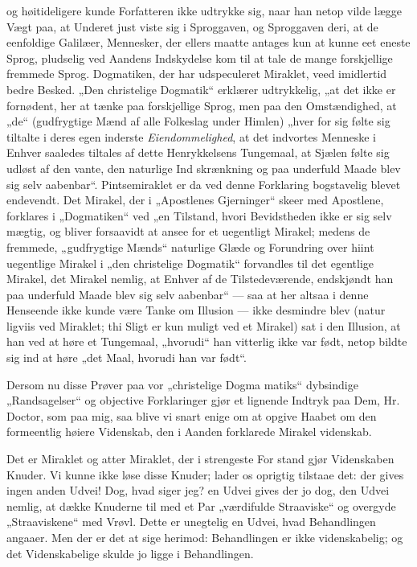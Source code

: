 \documentclass[12pt,a4paper]{article}
\newcommand{\opage}[1]{\marginnote{\footnotesize\textit{[#1]}}}
\begin{document}
og høitideligere kunde Forfatteren ikke udtrykke sig, naar han
netop vilde lægge Vægt paa, at Underet just viste sig i
Sproggaven, og Sproggaven deri, at de eenfoldige Galilæer,
Mennesker, der ellers maatte antages kun at kunne eet eneste
Sprog, pludselig ved Aandens Indskydelse kom til at tale de
mange forskjellige fremmede Sprog. Dogmatiken, der har
udspeculeret Miraklet, veed imidlertid bedre Besked. „Den
christelige Dogmatik“ erklærer udtrykkelig, „at det ikke er
fornødent, her at tænke paa forskjellige Sprog, men paa den
Omstændighed, at „de“ (gudfrygtige Mænd af alle Folkeslag
under Himlen) „hver for sig følte sig tiltalte i deres egen
inderste \emph{Eiendommelighed}, at det indvortes Menneske i
Enhver saaledes tiltales af dette Henrykkelsens Tungemaal,
at Sjælen følte sig udløst af den vante, den naturlige Ind\-%
skrænkning og paa underfuld Maade blev sig selv aabenbar“.
Pintsemiraklet er da ved denne Forklaring bogstavelig blevet
endevendt. Det Mirakel, der i „Apostlenes Gjerninger“ skeer
med Apostlene, forklares i „Dogmatiken“ ved „en Tilstand,
hvori Bevidstheden ikke er sig selv mægtig, og bliver forsaavidt%
at ansee for et uegentligt Mirakel; medens de fremmede,
„gudfrygtige Mænds“ naturlige Glæde og Forundring over
hiint uegentlige Mirakel i „den christelige Dogmatik“ forvandles
til det egentlige Mirakel, det Mirakel nemlig, at Enhver af
de Tilstedeværende, endskjøndt han paa underfuld Maade blev
sig selv aabenbar“ --- saa at her altsaa i denne Henseende ikke
kunde være Tanke om Illusion --- ikke desmindre blev (natur\-%
ligviis ved Miraklet; thi Sligt er kun muligt ved et Mirakel)
sat i den Illusion, at han ved at høre et Tungemaal,
„hvorudi“ han vitterlig ikke var født, netop bildte sig ind at
høre „det Maal, hvorudi han var født“.

\opage{11}\setcounter{footnote}{0}%
Dersom nu disse Prøver paa vor „christelige Dogma\-%
matiks“ dybsindige „Randsagelser“ og objective Forklaringer%
gjør et lignende Indtryk paa Dem, Hr. Doctor, som paa
mig, saa blive vi snart enige om at opgive Haabet om den
formeentlig høiere Videnskab, den i Aanden forklarede Mirakel\-%
videnskab.

Det er Miraklet og atter Miraklet, der i strengeste For\-%
stand gjør Videnskaben Knuder. Vi kunne ikke løse disse
Knuder; lader os oprigtig tilstaae det: der gives ingen anden
Udvei! Dog, hvad siger jeg? en Udvei gives der jo dog, den
Udvei nemlig, at dække Knuderne til med et Par „værdifulde
Straaviske“ og overgyde „Straaviskene“ med Vrøvl. Dette
er unegtelig en Udvei, hvad Behandlingen angaaer. Men
der er det at sige herimod: Behandlingen er ikke videnskabelig;
og det Videnskabelige skulde jo ligge i Behandlingen.
\end{document}
